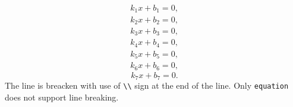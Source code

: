 \documentclass[leqno]{article}
\begin{document}
\begin{align}
    k_1x+b_1=0, \\
    k_2x+b_2=0,
\end{align}
\begin{gather}
    k_3x+b_3=0, \\
    k_4x+b_4=0,
\end{gather}
\begin{multline}
    k_5x+b_5=0, \\
    k_6x+b_6=0,
\end{multline}
\begin{equation}
    k_7x+b_7=0.
\end{equation}
The line is breacken with use of \verb|\\| sign at the end of the line. Only \verb|equation| does not support line breaking. 
\end{document}
